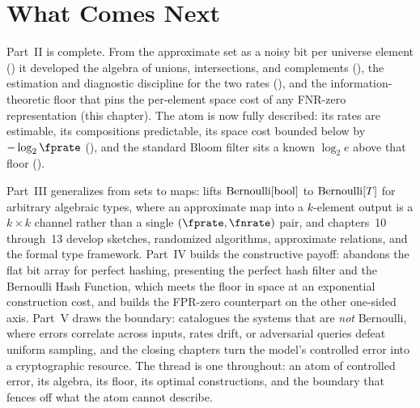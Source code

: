 %

\section{What Comes Next}
\label{sec:ch8-what-comes-next}

Part~II is complete. From the approximate set as a noisy bit per universe
element () it developed the algebra of unions,
intersections, and complements (), the estimation and
diagnostic discipline for the two rates (),
and the information-theoretic floor that pins the per-element space cost of any
FNR-zero representation (this chapter). The atom is now fully described: its
rates are estimable, its compositions predictable, its space cost bounded below
by $-\log_2 \fprate$ (), and the standard Bloom filter
sits a known $\log_2 e$ above that floor ().

Part~III generalizes from sets to maps:  lifts
$\mathrm{Bernoulli}[\mathrm{bool}]$ to $\mathrm{Bernoulli}[T]$ for arbitrary algebraic types,
where an approximate map into a $k$-element output is a $k \times k$ channel
rather than a single $(\fprate, \fnrate)$ pair, and chapters~10 through~13
develop sketches, randomized algorithms, approximate relations, and the formal
type framework. Part~IV builds the constructive payoff:
 abandons the flat bit array for perfect
hashing, presenting the perfect hash filter and the Bernoulli Hash Function,
which meets the floor in space at an exponential construction cost, and  builds the
FPR-zero counterpart on the other one-sided axis. Part~V draws the boundary:  catalogues
the systems that are \emph{not} Bernoulli, where errors correlate across
inputs, rates drift, or adversarial queries defeat uniform sampling, and the
closing chapters turn the model's controlled error into a cryptographic
resource. The thread is one throughout: an atom of controlled error, its
algebra, its floor, its optimal constructions, and the boundary that fences
off what the atom cannot describe.
